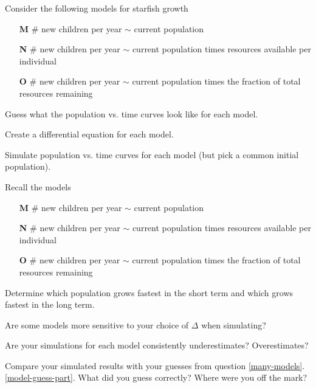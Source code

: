 \documentclass{workbook}
\begin{document}
\begin{slide}
	\question
	\label{many-models}
	Consider the following models for starfish growth
	\begin{itemize}
		\item[\textbf{M}] \# new children per year $\sim$ current population
		\item[\textbf{N}] \# new children per year $\sim$ current population times resources available per individual
		\item[\textbf{O}] \# new children per year $\sim$ current population times the fraction of total resources remaining
	\end{itemize}

	\begin{parts}
		\item Guess what the population vs. time curves look like for each model. \label{model-guess-part}
		\item Create a differential equation for each model.
		\item Simulate population vs. time curves for each model (but pick a common initial population).
	\end{parts}
\end{slide}

\begin{slide}
	\question
	Recall the models
	\begin{itemize}
		\item[\textbf{M}] \# new children per year $\sim$ current population
		\item[\textbf{N}] \# new children per year $\sim$ current population times resources available per individual
		\item[\textbf{O}] \# new children per year $\sim$ current population times the fraction of total resources remaining
	\end{itemize}

	\begin{parts}
		\item Determine which population grows fastest in the short term and which grows fastest in the long term.
		\item Are some models more sensitive to your choice of $\Delta$ when simulating?
		\item Are your simulations for each model consistently underestimates? Overestimates?
		\item Compare your simulated results with your guesses from question \ref{many-models}.\ref{model-guess-part}.
		What did you guess correctly? Where were you off the mark?
	\end{parts}
\end{slide}
\end{document}
